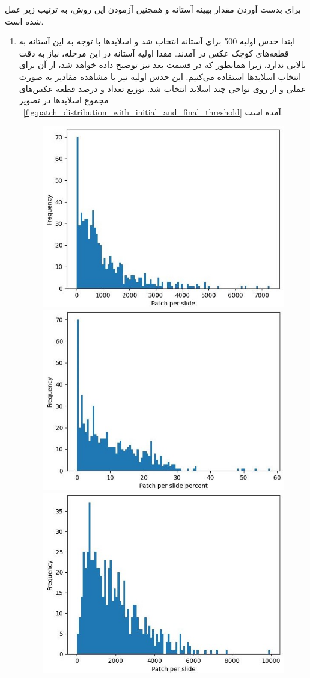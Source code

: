 برای بدست آوردن مقدار بهینه آستانه و همچنین آزمودن این روش، به ترتیب زیر عمل شده است.
\begin{enumerate}
    \item ابتدا حدس اولیه 500 برای آستانه انتخاب شد و اسلاید‌ها با توجه به این آستانه به قطعه‌های کوچک عکس در آمدند.
    مقدا اولیه آستانه در این مرحله، نیاز به دقت بالایی ندارد، زیرا همانطور که در قسمت بعد نیز توضیح داده خواهد شد، از آن برای انتخاب اسلاید‌ها استفاده می‌کنیم.
    این حدس اولیه نیز با مشاهده مقادیر به صورت عملی و از روی نواحی چند اسلاید انتخاب شد.
    توزیع تعداد و درصد قطعه عکس‌های مجموع اسلایدها در تصویر ~\ref{fig:patch_distribution_with_initial_and_final_threshold} آمده است.
    \begin{figure}
        \begin{center}
            \includegraphics[width=0.48\linewidth]{figs/introduction/subs/challenges/patch_distribution_old_500_threshold.jpeg}
            \includegraphics[width=0.48\linewidth]{figs/introduction/subs/challenges/patch_percent_distribution_old_threshold_500.jpeg}
            \hspace{.2cm}
            \includegraphics[width=0.48\linewidth]{figs/introduction/subs/challenges/patch_distribution_new_298_threshold.jpeg}

\end{center}
\end{figure}
\end{enumerate}
